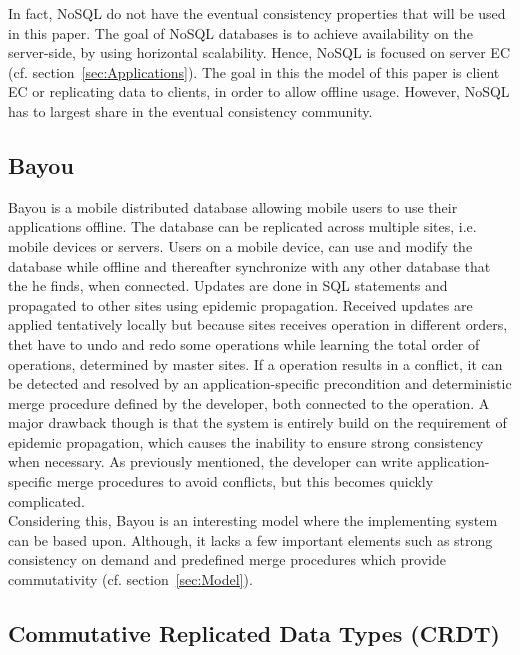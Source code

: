 \documentclass[a4paper,12pt]{report}
\begin{document}
In fact, NoSQL do not have the eventual consistency properties that will be used in this paper. The goal of NoSQL databases is to achieve availability on the server-side, by using horizontal scalability. Hence, NoSQL is focused on server EC (cf. section~\ref{sec:Applications}). The goal in this the model of this paper is client EC or replicating data to clients, in order to allow offline usage. However, NoSQL has to largest share in the eventual consistency community. 

\subsection{Bayou}\label{subsec:Bayou}

Bayou is a mobile distributed database allowing mobile users to use their applications offline. The database can be replicated across multiple sites, i.e. mobile devices or servers. Users on a mobile device, can use and modify the database while offline and thereafter synchronize with any other database that the he finds, when connected. Updates are done in SQL statements and propagated to other sites using epidemic propagation. Received updates are applied tentatively locally but because sites receives operation in different orders, thet have to undo and redo some operations while learning the total order of operations, determined by master sites. If a operation results in a conflict, it can be detected and resolved by an application-specific precondition and deterministic merge procedure defined by the developer, both connected to the operation. A major drawback though is that the system is entirely build on the requirement of epidemic propagation, which causes the inability to ensure strong consistency when necessary. As previously mentioned, the developer can write application-specific merge procedures to avoid conflicts, but this becomes quickly complicated. \\
Considering this, Bayou is an interesting model where the implementing system can be based upon. Although, it lacks a few important elements such as strong consistency on demand and predefined merge procedures which provide commutativity (cf. section~\ref{sec:Model}). 

\subsection{Commutative Replicated Data Types (CRDT)}\label{subsec:CRDT}
\end{document}
